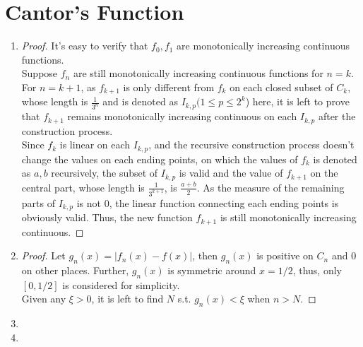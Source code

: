 \documentclass[paper=a4, fontsize=11pt]{scrartcl} %
\numberwithin{equation}{section} %
\numberwithin{figure}{section} %
\numberwithin{table}{section} %
\begin{document}
\section{Cantor's Function}
	\begin{enumerate}
		\item
			\begin{proof}
				It's easy to verify that $f_0, f_1$ are monotonically increasing continuous functions.\\
				Suppose $f_n$ are still monotonically increasing continuous functions for $ n = k$.\\
				For $n = k+1$, as $f_{k+1}$ is only different from $f_k$ on each closed subset of $C_k$, whose length is $\frac{1}{3^n}$ and is denoted as $I_{k, p} (1\leq p \leq 2^k$) here, it is left to prove that $f_{k+1}$ remains  monotonically increasing continuous on each $I_{k, p}$ after the construction process.\\
				Since $f_k$ is linear on each $I_{k, p}$, and the recursive construction process doesn't change the values on each ending points, on which the values of $f_k$ is denoted as $a, b$ recursively, the subset of $I_{k, p}$ is valid and the value of $f_{k+1}$ on the central part, whose length is $\frac{1}{3^{k+1}}$, is $\frac{a+b}{2}$. As the measure of the remaining parts of $I_{k, p}$ is not 0, the linear function connecting each ending points is obviously valid. Thus, the new function $f_{k+1}$ is still  monotonically increasing continuous.
			\end{proof}
		\item
			\begin{proof}
				Let $g_n(x) = \vert f_n(x) - f(x) \vert$, then $g_n(x)$ is positive on $C_n$ and 0 on other places. Further, $g_n(x)$ is symmetric around $x = 1/2$, thus, only $[0, 1/2]$ is considered for simplicity.\\
				Given any $\xi > 0$, it is left to find $N$ s.t. $g_n(x) < \xi$ when $n > N$.
			\end{proof}
		\item 
		
		\item 
		
	\end{enumerate}


\end{document}
